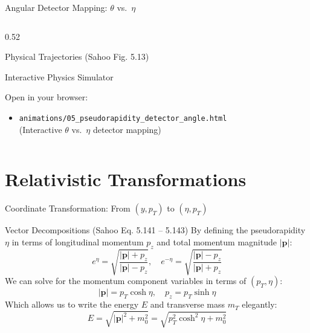 \documentclass[aspectratio=169]{beamer}
\begin{document}
\begin{frame}{Angular Detector Mapping: $\theta$ vs.\ $\eta$}
\begin{columns}
\begin{column}{0.52\textwidth}
\begin{block}{Physical Trajectories (Sahoo Fig. 5.13)}
            \end{block}
            \begin{alertblock}{Interactive Physics Simulator}
                {\sloppy Open in your browser:
                \begin{itemize}
                    \item \texttt{animations/05\_pseudo\-rapidity\_detector\_angle.html}\\
                    {\tiny (Interactive $\theta$ vs.\ $\eta$ detector mapping)}
                \end{itemize}}%
            \end{alertblock}
        \end{column}
    \end{columns}
\end{frame}

\section{Relativistic Transformations}

\begin{frame}{Coordinate Transformation: From $(y, p_T)$ to $(\eta, p_T)$}
    \begin{block}{Vector Decompositions (Sahoo Eq. 5.141 -- 5.143)}
        \small
        By defining the pseudorapidity $\eta$ in terms of longitudinal momentum $p_z$ and total momentum magnitude $|\mathbf{p}|$:
        \[ e^\eta = \sqrt{\frac{|\mathbf{p}| + p_z}{|\mathbf{p}| - p_z}}, \quad e^{-\eta} = \sqrt{\frac{|\mathbf{p}| - p_z}{|\mathbf{p}| + p_z}} \]
        We can solve for the momentum component variables in terms of $(p_T, \eta)$:
        \[ |\mathbf{p}| = p_T \cosh \eta, \quad p_z = p_T \sinh \eta \]
        Which allows us to write the energy $E$ and transverse mass $m_T$ elegantly:
        \[ E = \sqrt{|\mathbf{p}|^2 + m_0^2} = \sqrt{p_T^2 \cosh^2 \eta + m_0^2} \]
    \end{block}
\end{frame}
\end{document}
